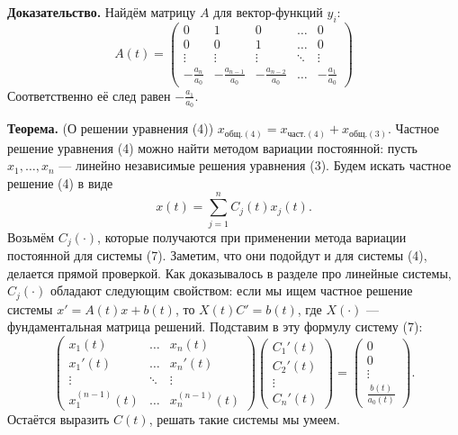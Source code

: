 \textbf{Доказательство.} Найдём матрицу $A$ для вектор-функций $y_i$:
\[
    A(t) =
    \begin{pmatrix}
        0 & 1 & 0 & \dots & 0 \\
        0 & 0 & 1 & \dots & 0 \\
        \vdots & \vdots & \vdots & \ddots & \vdots \\
        -\frac{a_n}{a_0} & -\frac{a_{n-1}}{a_0} & -\frac{a_{n-2}}{a_0} & \dots & -\frac{a_1}{a_0}
    \end{pmatrix}
\]
Соответственно её след равен $-\frac{a_1}{a_0}$.

\QED

\textbf{Теорема.} (О решении уравнения (4)) $x_{\text{общ.}(4)} = x_{\text{част.}(4)} + x_{\text{общ.}(3)}$.
Частное решение уравнения (4) можно найти методом вариации постоянной: пусть $x_1, \dots, x_n$ --- линейно независимые решения уравнения (3).
Будем искать частное решение (4) в виде
\[
    x(t) = \sum_{j=1}^{n} C_j(t) x_j(t).
\]
Возьмём $C_j(\cdot)$, которые получаются при применении метода вариации постоянной для системы (7).
Заметим, что они подойдут и для системы (4), делается прямой проверкой.
Как доказывалось в разделе про линейные системы, $C_j(\cdot)$ обладают следующим свойством: если мы ищем частное решение системы $x' = A(t) x + b(t)$, то $X(t) C' = b(t)$, где $X(\cdot)$ --- фундаментальная матрица решений.
Подставим в эту формулу систему (7):
\[
    \begin{pmatrix}
        x_1(t) & \dots & x_n(t) \\
        x_1'(t) & \dots & x_n'(t) \\
        \vdots & \ddots & \vdots \\
        x_1^{(n-1)}(t) & \dots & x_n^{(n-1)}(t)
    \end{pmatrix}
    \begin{pmatrix}
        C_1'(t) \\
        C_2'(t) \\
        \vdots \\
        C_n'(t)
    \end{pmatrix}
    =
    \begin{pmatrix}
        0 \\
        0 \\
        \vdots \\
        \frac{b(t)}{a_0(t)}
    \end{pmatrix} .
\]
Остаётся выразить $C(t)$, решать такие системы мы умеем.

